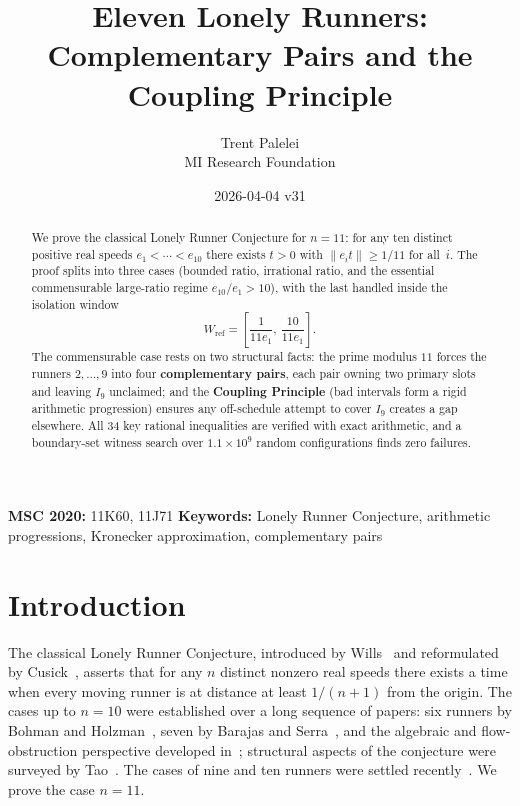 \documentclass[12pt,a4paper]{amsart}
\title{Eleven Lonely Runners: Complementary Pairs and the Coupling Principle}
\author{Trent Palelei\\[2pt]\small MI Research Foundation}
\date{2026-04-04 \quad v31}
\theoremstyle{definition}
\theoremstyle{remark}
\newcommand{\Wref}{W_{\mathrm{ref}}}
\newcommand{\norm}[1]{\left\|#1\right\|}
\begin{document}
\begin{abstract}
We prove the classical Lonely Runner Conjecture for $n=11$: for any ten distinct positive
real speeds $e_1<\cdots<e_{10}$ there exists $t>0$ with $\norm{e_i t}\ge 1/11$ for all~$i$.
The proof splits into three cases (bounded ratio, irrational ratio, and the essential
commensurable large-ratio regime $e_{10}/e_1>10$), with the last handled inside the
isolation window
\[
  \Wref = \left[\frac{1}{11e_1},\,\frac{10}{11e_1}\right].
\]
The commensurable case rests on two structural facts: the prime modulus $11$ forces the
runners $2,\ldots,9$ into four \textbf{complementary pairs}, each pair owning two primary
slots and leaving $I_9$ unclaimed; and the \textbf{Coupling Principle} (bad intervals form
a rigid arithmetic progression) ensures any off-schedule attempt to cover $I_9$ creates a
gap elsewhere.
All 34 key rational inequalities are verified with exact arithmetic, and a boundary-set
witness search over $1.1\times 10^9$ random configurations finds zero failures.
\end{abstract}

\maketitle

\textbf{MSC 2020:} 11K60, 11J71 \quad
\textbf{Keywords:} Lonely Runner Conjecture, arithmetic progressions,
Kronecker approximation, complementary pairs

\tableofcontents

\section{Introduction}

The classical Lonely Runner Conjecture, introduced by Wills~\cite{Wil67} and reformulated by
Cusick~\cite{Cus73}, asserts that for any $n$ distinct nonzero real speeds there exists a
time when every moving runner is at distance at least $1/(n+1)$ from the origin. The cases
up to $n=10$ were established over a long sequence of papers: six runners by Bohman and
Holzman~\cite{BH01}, seven by Barajas and Serra~\cite{BS08}, and the algebraic and
flow-obstruction perspective developed in~\cite{BGG+98}; structural aspects of the
conjecture were surveyed by Tao~\cite{Tao18}. The cases of nine and ten runners were
settled recently~\cite{Ros25a,Ros25b,Tra25}. We prove the case $n=11$.
\end{document}
